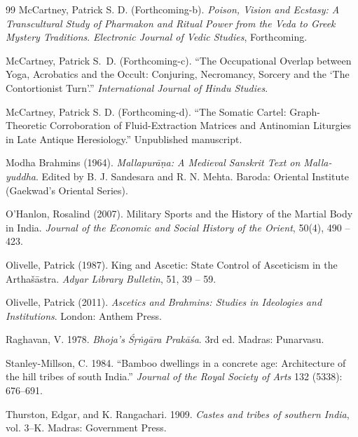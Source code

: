 \documentclass[11pt,twoside,letterpaper]{article}
\begin{document}
\begin{thebibliography}{99}
McCartney, Patrick S. D. (Forthcoming-b). \textit{Poison, Vision and Ecstasy: A Transcultural Study of Pharmakon and Ritual Power from the Veda to Greek Mystery Traditions}. \textit{Electronic Journal of Vedic Studies}, Forthcoming.

McCartney, Patrick S.~D. (Forthcoming-c). ``The Occupational Overlap between Yoga, Acrobatics and the Occult: Conjuring, Necromancy, Sorcery and the `The Contortionist Turn'.'' \textit{International Journal of Hindu Studies}.

McCartney, Patrick S. D. (Forthcoming-d). 
\newblock ``The Somatic Cartel: Graph-Theoretic Corroboration of Fluid-Extraction Matrices and Antinomian Liturgies in Late Antique Heresiology.'' 
\newblock Unpublished manuscript.

Modha Brahmins (1964). \textit{Mallapur\={a}\d{n}a: A Medieval Sanskrit Text on Malla-yuddha}. Edited by B. J. Sandesara and R. N. Mehta. Baroda: Oriental Institute (Gaekwad's Oriental Series).

O'Hanlon, Rosalind (2007). Military Sports and the History of the Martial Body in India. \textit{Journal of the Economic and Social History of the Orient}, 50(4), 490 -- 423.

Olivelle, Patrick (1987). King and Ascetic: State Control of Asceticism in the Artha\v{s}\={a}stra. \textit{Adyar Library Bulletin}, 51, 39 -- 59.

Olivelle, Patrick (2011). \textit{Ascetics and Brahmins: Studies in Ideologies and Institutions}. London: Anthem Press.

Raghavan, V. 1978. \textit{Bhoja's \'{S}\d{r}\.{n}g\={a}ra Prak\={a}\'{s}a}. 3rd ed. Madras: Punarvasu.

Stanley-Millson, C. 1984. ``Bamboo dwellings in a concrete age: Architecture of the hill tribes of south India.'' \textit{Journal of the Royal Society of Arts} 132 (5338): 676--691.

Thurston, Edgar, and K. Rangachari. 1909. \textit{Castes and tribes of southern India}, vol. 3--K. Madras: Government Press.


\end{thebibliography}
\end{document}
